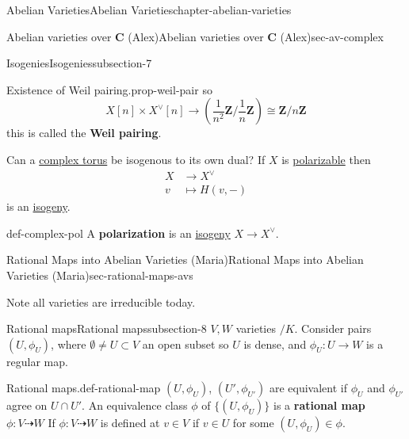 \documentclass[oneside,10pt,]{book}
\newcommand{\terminology}[1]{\textbf{#1}}
\numberwithin{equation}{section}
\newcommand{\ZZ}{\mathbf{Z}}
\newcommand{\CC}{\mathbf{C}}
\newcommand{\amp}{&}
\begin{document}
\begin{chapterptx}{Abelian Varieties}{}{Abelian Varieties}{}{}{chapter-abelian-varieties}
\begin{sectionptx}{Abelian varieties over \(\CC\) (Alex)}{}{Abelian varieties over \(\CC\) (Alex)}{}{}{sec-av-complex}
\begin{subsectionptx}{Isogenies}{}{Isogenies}{}{}{subsection-7}
\begin{proposition}{Existence of Weil pairing.}{}{prop-weil-pair}
so%
\begin{equation*}
X[n] \times X^\vee[n] \to \left(\frac{1}{n^2} \ZZ/\frac{1}{n} \ZZ\right) \cong \ZZ/n\ZZ
\end{equation*}
this is called the \terminology{Weil pairing}.%
\end{proposition}
\hypertarget{p-80}{}%
Can a \hyperref[def-complex-torus]{complex torus} be isogenous to its own dual? If \(X\) is \hyperref[def-polarizable]{polarizable} then%
\begin{align*}
X \amp\to X^\vee\\
v\amp\mapsto H(v,-)
\end{align*}
is an \hyperref[def-supersing-isog-isog]{isogeny}.%
\begin{definition}{}{def-complex-pol}%
\hypertarget{p-81}{}%
A \terminology{polarization} is an \hyperref[def-supersing-isog-isog]{isogeny} \(X \to X^\vee\).%
\end{definition}
\end{subsectionptx}
\end{sectionptx}
%
%
\typeout{************************************************}
\typeout{************************************************}
%
\begin{sectionptx}{Rational Maps into Abelian Varieties (Maria)}{}{Rational Maps into Abelian Varieties (Maria)}{}{}{sec-rational-maps-avs}
\begin{introduction}{}%
\hypertarget{p-82}{}%
Note all varieties are irreducible today.%
\end{introduction}%
%
%
\typeout{************************************************}
\typeout{************************************************}
%
\begin{subsectionptx}{Rational maps}{}{Rational maps}{}{}{subsection-8}
\hypertarget{p-83}{}%
\(V,W\) varieties \(/K\). Consider pairs \((U,\phi_U)\), where \(\emptyset \ne  U \subset V\) an open subset so \(U\) is dense, and \(\phi_U \colon U \to W\) is a regular map.%
\begin{definition}{Rational maps.}{def-rational-map}%
\hypertarget{p-84}{}%
\((U,\phi_U)\), \((U',{\phi_{U'}})\) are equivalent if \(\phi_U\) and \(\phi_{U'}\) agree on \(U \cap U'\). An equivalence class \(\phi\) of \(\{(U, \phi_U)\}\) is a \terminology{rational map} \(\phi \colon V \dashrightarrow W\) If \(\phi\colon V \dashrightarrow W\) is defined at   \(v\in V\) if \(v\in U\) for some \((U,\phi_U) \in \phi\).%
\end{definition}

\end{subsectionptx}
\end{sectionptx}
\end{chapterptx}
\end{document}
